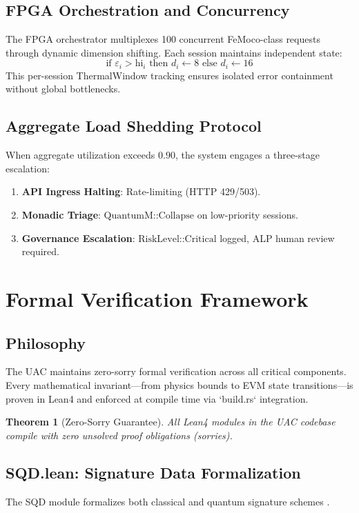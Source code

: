 \documentclass[11pt,a4paper]{article}
\newtheorem{theorem}{Theorem}[section]
\begin{document}
\subsection{FPGA Orchestration and Concurrency}
The FPGA orchestrator multiplexes 100 concurrent FeMoco-class requests through dynamic dimension shifting. Each session maintains independent state:
\[
\text{if } \varepsilon_i > \text{hi}_i \text{ then } d_i \leftarrow 8 \text{ else } d_i \leftarrow 16
\]
This per-session ThermalWindow tracking ensures isolated error containment without global bottlenecks.

\subsection{Aggregate Load Shedding Protocol}
When aggregate utilization exceeds $0.90$, the system engages a three-stage escalation:
\begin{enumerate}
    \item \textbf{API Ingress Halting}: Rate-limiting (HTTP 429/503).
    \item \textbf{Monadic Triage}: $\text{QuantumM::Collapse}$ on low-priority sessions.
    \item \textbf{Governance Escalation}: $\text{RiskLevel::Critical}$ logged, ALP human review required.
\end{enumerate}

\section{Formal Verification Framework}

\subsection{Philosophy}
The UAC maintains zero-sorry formal verification across all critical components. Every mathematical invariant—from physics bounds to EVM state transitions—is proven in Lean4 and enforced at compile time via `build.rs` integration.

\begin{theorem}[Zero-Sorry Guarantee]
All Lean4 modules in the UAC codebase compile with zero unsolved proof obligations (sorries).
\end{theorem}

\subsection{SQD.lean: Signature Data Formalization}
The SQD module formalizes both classical and quantum signature schemes \cite{sqdSpecification}.
\end{document}
